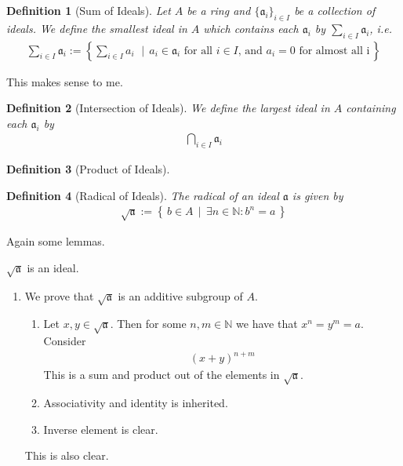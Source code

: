 \documentclass{book}
\theoremstyle{custom_definition}
\newtheorem{definition}{Definition}
\theoremstyle{custom_theorem}
\begin{document}
    \begin{definition}[Sum of Ideals]
        Let \(A\) be a ring and \(\{\mathfrak{a}_i\}_{i \in I}\) be a collection of ideals. We define the smallest ideal in \(A\) which contains each \(\mathfrak{a}_i\) by \(\sum_{i \in I} \mathfrak{a}_i\), i.e.
        \begin{align}
            \sum_{i \in I} \mathfrak{a}_i := \left\{ \sum_{i \in I} a_i \, \,\mid\, a_i \in \mathfrak{a}_i \text{ for all \(i \in I\), and \(a_i = 0\) for almost all i}\,\right\}
        \end{align}
    \end{definition}

    This makes sense to me.

    \begin{definition}[Intersection of Ideals]
        We define the largest ideal in \(A\) containing each \(\mathfrak{a}_i\) by
        \begin{align}
            \bigcap_{i \in I} \mathfrak{a}_i
        \end{align}       
    \end{definition}

    \begin{definition}[Product of Ideals]
        
    \end{definition}

    \begin{definition}[Radical of Ideals]
        The radical of an ideal \(\mathfrak{a}\) is given by
        \begin{align}
            \sqrt{\mathfrak{a}} := \left\{\, b \in A \, \mid \, \exists n \in \mathbb{N} : b^n = a \,\right\}
        \end{align}
    \end{definition}

    Again some lemmas.

    \(\sqrt{\mathfrak{a}}\) is an ideal.
    \begin{enumerate}
        \item We prove that \(\sqrt{\mathfrak{a}}\) is an additive subgroup of \(A\).
        \begin{enumerate}
            \item Let \(x, y \in \sqrt{\mathfrak{a}}\). Then for some \(n, m \in \mathbb{N}\) we have that \(x^n = y^m = a\). Consider
            \begin{align}
                (x + y)^{n + m}
            \end{align}
            This is a sum and product out of the elements in \(\sqrt{\mathfrak{a}}\).
            \item Associativity and identity is inherited.
            \item Inverse element is clear.
        \end{enumerate}
        This is also clear.
    \end{enumerate}
\end{document}
